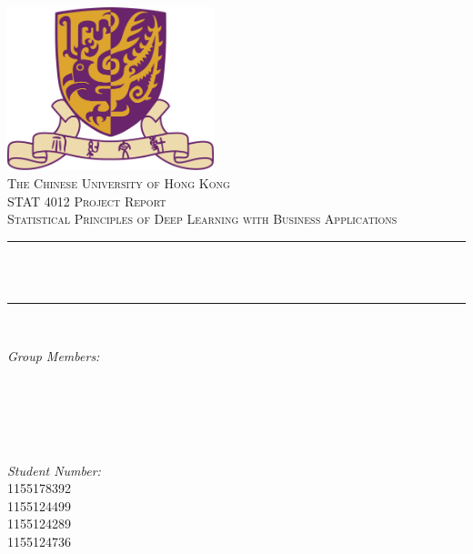 \begin{titlepage}
    \centering
    \vspace*{0.5 cm}
    \includegraphics[scale = 0.75,width=6cm]{CUHK}\\[1.0 cm]  
    \textsc{\large The Chinese University of Hong Kong}\\[2 cm] 
    \textsc{\Large STAT 4012 Project Report}\\[0.5 cm] 
    \textsc{\large Statistical Principles of Deep Learning with Business Applications}\\[0.5 cm]               
    \rule{\linewidth}{0.2 mm} \\[0.4 cm]
    { \huge \bfseries \thetitle}\\
    \rule{\linewidth}{0.2 mm} \\[1.5 cm]
    
    \begin{minipage}{0.4\textwidth}
        \begin{flushleft} \large
            \emph{Group Members:}\\
             \\
             \\
             \\
            \end{flushleft}
    \end{minipage}~
    \begin{minipage}{0.4\textwidth}
            \begin{flushright} \large
            \emph{Student Number:} \\
            1155178392 \\
            1155124499 \\
            1155124289 \\
            1155124736  
        \end{flushright}
    \end{minipage}\\[2 cm]
    {\large \thedate}\\[2 cm]
 
    \vfill
    
\end{titlepage}

